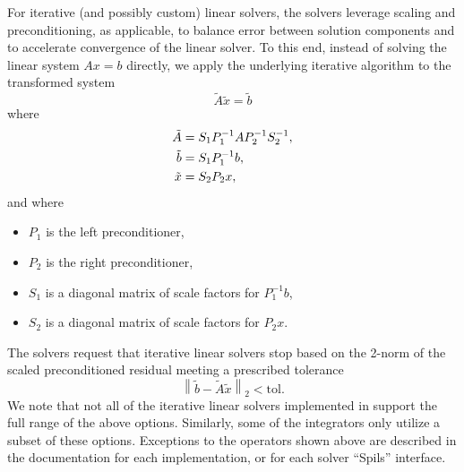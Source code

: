 For iterative (and possibly custom) linear solvers, the {\sundials}
solvers leverage scaling and preconditioning, as applicable, to
balance error between solution components and to accelerate
convergence of the linear solver.  To this end, instead of solving the 
linear system $Ax = b$ directly, we apply the underlying iterative
algorithm to the transformed system  
\begin{equation}
  \label{eq:transformed_linear_system}
  \tilde{A} \tilde{x} = \tilde{b}
\end{equation}
where
\begin{align}
  \notag
  \tilde{A} &= S_1 P_1^{-1} A P_2^{-1} S_2^{-1},\\
  \label{eq:transformed_linear_system_components}
  \tilde{b} &= S_1 P_1^{-1} b,\\
  \notag
  \tilde{x} &= S_2 P_2 x,
\end{align} 
and where
\begin{itemize}
\item $P_1$ is the left preconditioner,
\item $P_2$ is the right preconditioner,
\item $S_1$ is a diagonal matrix of scale factors for $P_1^{-1} b$,
\item $S_2$ is a diagonal matrix of scale factors for $P_2 x$.
\end{itemize}
The {\sundials} solvers request that iterative linear solvers stop
based on the 2-norm of the scaled preconditioned residual meeting a
prescribed tolerance
\[
  \left\| \tilde{b} - \tilde{A} \tilde{x} \right\|_2  <  \text{tol}.
\]
We note that not all of the iterative linear solvers implemented in
{\sundials} support the full range of the above options.  Similarly,
some of the {\sundials} integrators only utilize a subset of these
options.  Exceptions to the operators shown above are described in
the documentation for each {\sunlinsol} implementation, or for each
{\sundials} solver ``Spils'' interface.

